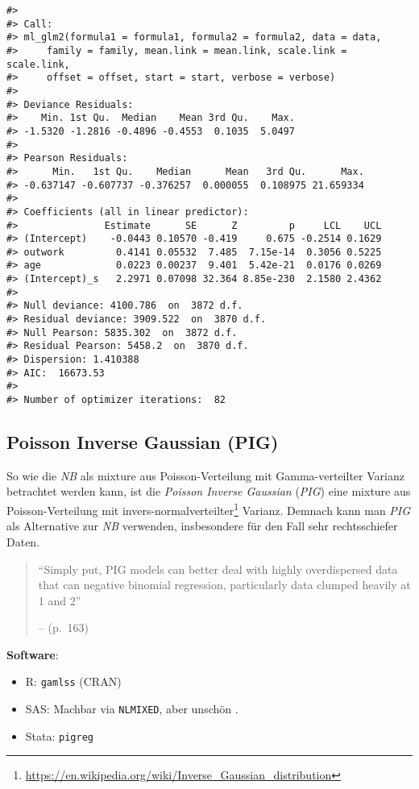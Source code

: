 \documentclass[ngerman,a4paper,]{scrartcl}
\renewcommand{\href}[2]{#2\footnote{\url{#1}}}
\providecommand{\tightlist}{%
  \setlength{\itemsep}{0pt}\setlength{\parskip}{0pt}}
\let\rmarkdownfootnote\footnote%
\def\footnote{\protect\rmarkdownfootnote}
\theoremstyle{definition}
\theoremstyle{definition}
\theoremstyle{definition}
\theoremstyle{remark}
\begin{document}
\begin{verbatim}
#> 
#> Call:
#> ml_glm2(formula1 = formula1, formula2 = formula2, data = data, 
#>     family = family, mean.link = mean.link, scale.link = scale.link, 
#>     offset = offset, start = start, verbose = verbose)
#> 
#> Deviance Residuals:
#>    Min. 1st Qu.  Median    Mean 3rd Qu.    Max. 
#> -1.5320 -1.2816 -0.4896 -0.4553  0.1035  5.0497 
#> 
#> Pearson Residuals:
#>      Min.   1st Qu.    Median      Mean   3rd Qu.      Max. 
#> -0.637147 -0.607737 -0.376257  0.000055  0.108975 21.659334 
#> 
#> Coefficients (all in linear predictor):
#>               Estimate      SE      Z         p     LCL    UCL
#> (Intercept)    -0.0443 0.10570 -0.419     0.675 -0.2514 0.1629
#> outwork         0.4141 0.05532  7.485  7.15e-14  0.3056 0.5225
#> age             0.0223 0.00237  9.401  5.42e-21  0.0176 0.0269
#> (Intercept)_s   2.2971 0.07098 32.364 8.85e-230  2.1580 2.4362
#> 
#> Null deviance: 4100.786  on  3872 d.f.
#> Residual deviance: 3909.522  on  3870 d.f.
#> Null Pearson: 5835.302  on  3872 d.f.
#> Residual Pearson: 5458.2  on  3870 d.f.
#> Dispersion: 1.410388
#> AIC:  16673.53
#> 
#> Number of optimizer iterations:  82
\end{verbatim}

\hypertarget{mod-pig}{%
\subsection{Poisson Inverse Gaussian (PIG)}\label{mod-pig}}

So wie die \emph{NB} als mixture aus Poisson-Verteilung mit Gamma-verteilter Varianz betrachtet werden kann, ist die \emph{Poisson Inverse Gaussian} (\emph{PIG}) eine mixture aus Poisson-Verteilung mit \href{https://en.wikipedia.org/wiki/Inverse_Gaussian_distribution}{invers-normalverteilter} Varianz. Demnach kann man \emph{PIG} als Alternative zur \emph{NB} verwenden, insbesondere für den Fall sehr rechtsschiefer Daten.

\begin{quote}
\enquote{Simply put, PIG models can better deal with highly overdispersed data that can negative binomial regression, particularly data clumped heavily at 1 and 2}

-- \citet{hilbeModelingCountData2014} (p.~163)
\end{quote}

\textbf{Software}:

\begin{itemize}
\tightlist
\item
  R: \texttt{gamlss} (CRAN)
\item
  SAS: Machbar via \texttt{NLMIXED}, aber unschön \citep[siehe][]{high2018AlternativeVariance}.
\item
  Stata: \texttt{pigreg}
\end{itemize}
\end{document}
